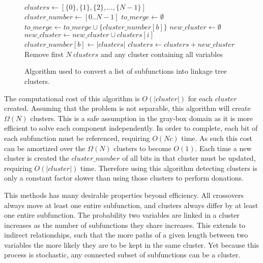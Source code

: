 \begin{figure}
  \begin{algorithmic}[1]
    \State $clusters \leftarrow [\{0\}, \{1\}, \{2\}, \dots, \{N-1\}]$
    \State $cluster\_number \leftarrow [0 .. N-1]$
      \State $to\_merge \leftarrow \emptyset$
        \State $to\_merge \leftarrow to\_merge \cup \{cluster\_number[b]\}$
      \EndFor
        \State $new\_cluster \leftarrow \emptyset$
          \State $new\_cluster \leftarrow new\_cluster \cup clusters[i]$
        \EndFor
          \State $cluster\_number[b] \leftarrow |clusters|$
        \EndFor
        \State $clusters \leftarrow clusters + new\_cluster$
      \EndIf
    \EndFor
    \State Remove first $N~clusters$ and any cluster containing all variables
  \EndProcedure
\end{algorithmic}
  \caption{Algorithm used to convert a list of subfunctions into linkage tree clusters.}
  \label{fig-sfx-tree}
\end{figure}

The computational cost of this algorithm is $O(|cluster|)$ for each $cluster$ created.
Assuming that the problem is not separable, this algorithm will create
$\Omega(N)$ clusters. This is a safe assumption in the gray-box domain as it is more
efficient to solve each component independently.
In order to complete,
each bit of each subfunction must be referenced, requiring $O(Nc)$ time. As such this cost can
be amortized over the $\Omega(N)$ clusters to become $O(1)$.
Each time a new cluster is created
the $cluster\_number$ of all bits in that cluster must be updated, requiring $O(|cluster|)$ time.
Therefore using this algorithm detecting clusters is only a constant factor slower than using those clusters
to perform donations.

This methods has many desirable properties beyond efficiency. All crossovers always move at least one entire subfunction,
and clusters always differ by at least one entire subfunction. The probability two variables are linked in a
cluster increases as the number of subfunctions they share increases. This extends to indirect relationships, such that
the more paths of a given length between two variables the more likely they are to be kept in the same cluster.
Yet because this process is stochastic, any connected subset of subfunctions can be a cluster.

